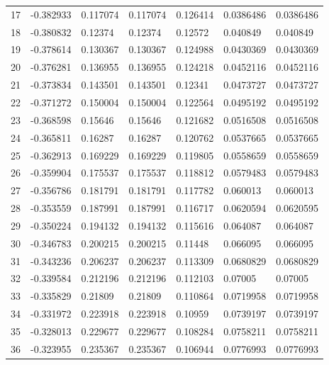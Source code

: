 \begin{longtable}{l|lll|lll}
  17 & -0.382933    & 0.117074    & 0.117074    &  0.126414    & 0.0386486   & 0.0386486   \\
  18 & -0.380832    & 0.12374     & 0.12374     &  0.12572     & 0.040849    & 0.040849    \\
  19 & -0.378614    & 0.130367    & 0.130367    &  0.124988    & 0.0430369   & 0.0430369   \\
  20 & -0.376281    & 0.136955    & 0.136955    &  0.124218    & 0.0452116   & 0.0452116   \\
  21 & -0.373834    & 0.143501    & 0.143501    &  0.12341     & 0.0473727   & 0.0473727   \\
  22 & -0.371272    & 0.150004    & 0.150004    &  0.122564    & 0.0495192   & 0.0495192   \\
  23 & -0.368598    & 0.15646     & 0.15646     &  0.121682    & 0.0516508   & 0.0516508   \\
  24 & -0.365811    & 0.16287     & 0.16287     &  0.120762    & 0.0537665   & 0.0537665   \\
  25 & -0.362913    & 0.169229    & 0.169229    &  0.119805    & 0.0558659   & 0.0558659   \\
  26 & -0.359904    & 0.175537    & 0.175537    &  0.118812    & 0.0579483   & 0.0579483   \\
  27 & -0.356786    & 0.181791    & 0.181791    &  0.117782    & 0.060013    & 0.060013    \\
  28 & -0.353559    & 0.187991    & 0.187991    &  0.116717    & 0.0620594   & 0.0620595   \\
  29 & -0.350224    & 0.194132    & 0.194132    &  0.115616    & 0.064087    & 0.064087    \\
  30 & -0.346783    & 0.200215    & 0.200215    &  0.11448     & 0.066095    & 0.066095    \\
  31 & -0.343236    & 0.206237    & 0.206237    &  0.113309    & 0.0680829   & 0.0680829   \\
  32 & -0.339584    & 0.212196    & 0.212196    &  0.112103    & 0.07005     & 0.07005     \\
  33 & -0.335829    & 0.21809     & 0.21809     &  0.110864    & 0.0719958   & 0.0719958   \\
  34 & -0.331972    & 0.223918    & 0.223918    &  0.10959     & 0.0739197   & 0.0739197   \\
  35 & -0.328013    & 0.229677    & 0.229677    &  0.108284    & 0.0758211   & 0.0758211   \\
  36 & -0.323955    & 0.235367    & 0.235367    &  0.106944    & 0.0776993   & 0.0776993   \\

\end{longtable}
